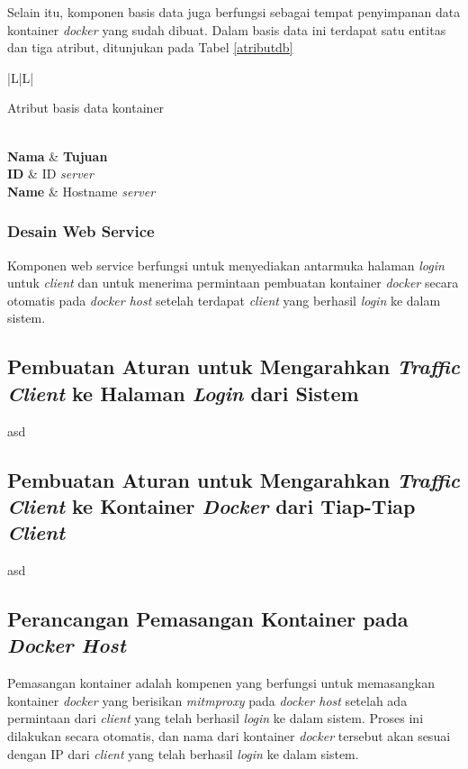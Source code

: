    	Selain itu, komponen basis data juga berfungsi sebagai tempat penyimpanan data kontainer \textit{docker} yang sudah dibuat. Dalam basis data ini terdapat satu entitas dan tiga atribut, ditunjukan pada Tabel \ref{atributdb}
   	\begin{ltabulary}{|L|L|} 
   		\caption{Atribut basis data kontainer} \label{atributdb} \\
   		\hline
   		\textbf{Nama} & \textbf{Tujuan} \\ \hline
   		\endhead
   		\endfoot
   		\endlastfoot
   		\textbf{ID} & ID \textit{server}\\ \hline
   		\textbf{Name} & Hostname \textit{server} \\ \hline
   	\end{ltabulary}
	   
   	\subsubsection{Desain Web Service}
	Komponen web service berfungsi untuk menyediakan antarmuka halaman \textit{login} untuk \textit{client} dan untuk menerima permintaan pembuatan kontainer \textit{docker} secara otomatis pada \textit{docker host} setelah terdapat \textit{client} yang berhasil \textit{login} ke dalam sistem.
	
	\subsection{Pembuatan Aturan untuk Mengarahkan \textit{Traffic Client} ke Halaman \textit{Login} dari Sistem}
	asd
	
	\subsection{Pembuatan Aturan untuk Mengarahkan \textit{Traffic Client} ke Kontainer \textit{Docker} dari Tiap-Tiap \textit{Client}}
	asd
   	
    \subsection{Perancangan Pemasangan Kontainer pada \textit{Docker Host}}
	Pemasangan kontainer adalah kompenen yang berfungsi untuk memasangkan kontainer \textit{docker} yang berisikan \textit{mitmproxy} pada \textit{docker host} setelah ada permintaan dari \textit{client} yang telah berhasil \textit{login} ke dalam sistem. Proses ini dilakukan secara otomatis, dan nama dari kontainer \textit{docker} tersebut akan sesuai dengan IP dari \textit{client} yang telah berhasil \textit{login} ke dalam sistem.   

      